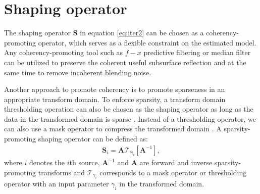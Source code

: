 \section{Shaping operator}
The shaping operator $\mathbf{S}$ in equation \ref{eq:iter2} can be chosen as a coherency-promoting operator, which serves as a flexible constraint on the estimated model.
Any coherency-promoting tool such as $f-x$ predictive filtering \cite[]{canales1984,sacchi2000,galbraith2012,yangkang2014} or median filter \cite[]{liuyang2009tvmf,mediandeblend,yike2013} can be utilized to preserve the coherent useful subsurface reflection and at the same time to remove incoherent blending noise. 


Another approach to promote coherency is to promote sparseness in an appropriate transform domain. To enforce sparsity, a transform domain thresholding operation can also be chosen as the shaping operator as long as the data in the transformed domain is sparse \cite[]{mallat2009,candes2010}. Instead of a thresholding operator, we can also use a mask operator to compress the transformed domain \cite[]{mostafa2010,liuyang2012}. A sparsity-promoting shaping operator can be defined as:
\begin{align}
\label{eq:sparse1}
\mathbf{S}_i =\mathbf{A}\mathbf{\mathcal{T}}_{\mathbf{\gamma}_i}[\mathbf{A}^{-1}], 
\end{align}
where $i$ denotes the $i$th source, $\mathbf{A}^{-1}$ and $\mathbf{A}$ are forward and inverse sparsity-promoting transforms and $\mathbf{\mathcal{T}}_{\gamma_i}$ corresponds to a mask operator or thresholding operator with an input parameter $\gamma_i$ in the transformed domain.

